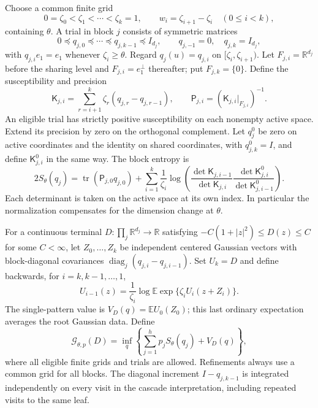 \documentclass[11pt]{article}
\numberwithin{equation}{section}
\theoremstyle{definition}
\newcommand{\E}{\mathbb E}
\newcommand{\R}{\mathbb R}
\newcommand{\tr}{\operatorname{tr}}
\newcommand{\diag}{\operatorname{diag}}
\newcommand{\Gauss}{\mathcal G}
\begin{document}
Choose a common finite grid
\begin{equation}\label{eq:grid}
0=\zeta_0<\zeta_1<\cdots<\zeta_k=1,
\qquad w_i=\zeta_{i+1}-\zeta_i\quad(0\le i<k),
\end{equation}
containing $\theta$. A trial in block $j$ consists of symmetric matrices
\[
0\preceq q_{j,0}\preceq\cdots\preceq q_{j,k-1}\preceq I_{d_j},
\qquad q_{j,-1}=0,\quad q_{j,k}=I_{d_j},
\]
with $q_{j,i}e_1=e_1$ whenever $\zeta_i\ge\theta$. Regard $q_j(u)=q_{j,i}$ on $[\zeta_i,\zeta_{i+1})$. Let $F_{j,i}=\R^{d_j}$ before the sharing level and $F_{j,i}=e_1^\perp$ thereafter; put $F_{j,k}=\{0\}$. Define the susceptibility and precision
\begin{equation}\label{eq:susceptibility}
\mathsf K_{j,i}=\sum_{r=i+1}^k\zeta_r(q_{j,r}-q_{j,r-1}),
\qquad \mathsf P_{j,i}=(\mathsf K_{j,i}|_{F_{j,i}})^{-1}.
\end{equation}
An eligible trial has strictly positive susceptibility on each nonempty active space. Extend its precision by zero on the orthogonal complement. Let $q_j^0$ be zero on active coordinates and the identity on shared coordinates, with $q_{j,k}^0=I$, and define $\mathsf K_{j,i}^0$ in the same way. The block entropy is
\begin{equation}\label{eq:entropy}
2S_\theta(q_j)=\tr(\mathsf P_{j,0}q_{j,0})+
\sum_{i=1}^k\frac1{\zeta_i}
\log\left(
\frac{\det\mathsf K_{j,i-1}}{\det\mathsf K_{j,i}}
\frac{\det\mathsf K_{j,i}^0}{\det\mathsf K_{j,i-1}^0}
\right).
\end{equation}
Each determinant is taken on the active space at its own index. In particular the normalization compensates for the dimension change at $\theta$.

For a continuous terminal $D:\prod_j\R^{d_j}\to\R$ satisfying $-C(1+|z|^2)\le D(z)\le C$ for some $C<\infty$, let $Z_0,\ldots,Z_k$ be independent centered Gaussian vectors with block-diagonal covariances $\diag_j(q_{j,i}-q_{j,i-1})$. Set $U_k=D$ and define backwards, for $i=k,k-1,\ldots,1$,
\[
U_{i-1}(z)=\frac1{\zeta_i}\log\E\exp\{\zeta_i U_i(z+Z_i)\}.
\]
The single-pattern value is $V_D(q)=\E U_0(Z_0)$; this last ordinary expectation averages the root Gaussian data. Define
\begin{equation}\label{eq:Gaussianfunctional}
\Gauss_{\theta,p}(D)=\inf_q\left\{\sum_{j=1}^h p_jS_\theta(q_j)+V_D(q)\right\},
\end{equation}
where all eligible finite grids and trials are allowed. Refinements always use a common grid for all blocks. The diagonal increment $I-q_{j,k-1}$ is integrated independently on every visit in the cascade interpretation, including repeated visits to the same leaf.
\end{document}
